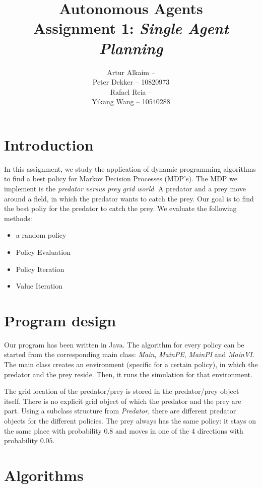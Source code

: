 \documentclass{article}
\begin{document}
\title{Autonomous Agents\\
Assignment 1: \emph{Single Agent Planning}}
\author{
Artur Alkaim --\\
Peter Dekker -- 10820973\\
Rafael Reia --\\
Yikang Wang -- 10540288\\
}
\maketitle
\section{Introduction}
In this assignment, we study the application of dynamic programming algorithms to find a best policy for Markov Decision Processes (MDP's). The MDP we implement is the \emph{predator versus prey grid world}. A predator and a prey move around a field, in which the predator wants to catch the prey. Our goal is to find the best poliy for the predator to catch the prey. We evaluate the following methods:
\begin{itemize}
\item a random policy
\item Policy Evaluation
\item Policy Iteration
\item Value Iteration
\end{itemize}
\section{Program design}
Our program has been written in Java. The algorithm for every policy can be started from the corresponding main class: \emph{Main}, \emph{MainPE}, \emph{MainPI} and \emph{MainVI}. The main class creates an environment (specific for a certain policy), in which the predator and the prey reside. Then, it runs the simulation for that environment. 

The grid location of the predator/prey is stored in the predator/prey object itself. There is no explicit grid object of which the predator and the prey are part. Using a subclass structure from \emph{Predator}, there are different predator objects for the different policies. The prey always has the same policy: it stays on the same place with probability $0.8$ and moves in one of the 4 directions with probability $0.05$.
\section{Algorithms}
\end{document}
